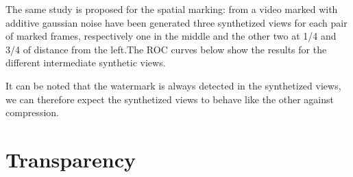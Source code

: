 \begin{table}[htbp]
 \label{Tab:syntDFT}
 \begin{center}
 \caption{}
 \end{center}
 \end{table}
 
  
The same study is proposed for the spatial marking: from a video marked with additive gaussian noise have been generated three synthetized views for each pair of marked frames, respectively one in the middle and the other two at 1/4 and 3/4 of distance from the left.\newline The ROC curves below show the results for the different intermediate synthetic views.\newline 

It can be noted that the watermark is always detected in the synthetized views, we can therefore expect the synthetized views to behave like the other against compression.
 
\section{Transparency}

